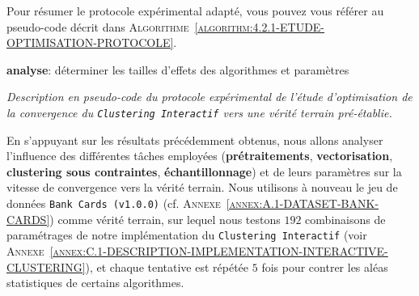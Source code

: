 			Pour résumer le protocole expérimental adapté, vous pouvez vous référer au pseudo-code décrit dans \textsc{Algorithme~\ref{algorithm:4.2.1-ETUDE-OPTIMISATION-PROTOCOLE}}.
			
			\begin{algorithm}
				\textbf{analyse}: déterminer les tailles d'effets des algorithmes et paramètres \;
				\caption{\textit{
					Description en pseudo-code du protocole expérimental de l'étude d'optimisation de la convergence du \texttt{Clustering Interactif} vers une vérité terrain pré-établie.
				}}
				\label{algorithm:4.2.1-ETUDE-OPTIMISATION-PROTOCOLE}
			\end{algorithm}
			
			En s'appuyant sur les résultats précédemment obtenus,
			nous allons analyser l'influence des différentes tâches employées (\textbf{prétraitements}, \textbf{vectorisation}, \textbf{clustering sous contraintes}, \textbf{échantillonnage}) et de leurs paramètres sur la vitesse de convergence vers la vérité terrain.
			Nous utilisons à nouveau le jeu de données \texttt{Bank Cards (v1.0.0)} (cf. \textsc{Annexe~\ref{annex:A.1-DATASET-BANK-CARDS}}) comme vérité terrain, sur lequel nous testons $192$ combinaisons de paramétrages de notre implémentation du \texttt{Clustering Interactif} (voir \textsc{Annexe~\ref{annex:C.1-DESCRIPTION-IMPLEMENTATION-INTERACTIVE-CLUSTERING}}), et chaque tentative est répétée $5$ fois pour contrer les aléas statistiques de certains algorithmes.
			
